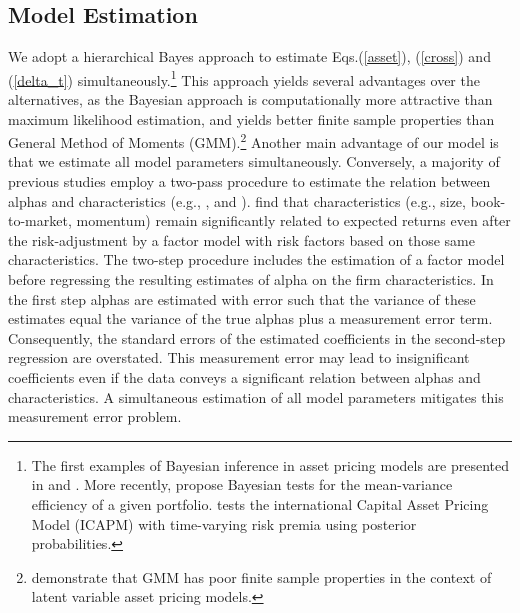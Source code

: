 \subsection{Model Estimation}
\label{Bayes_Model} 
We adopt a hierarchical Bayes approach to estimate Eqs.(\ref{asset}), (\ref{cross}) and (\ref{delta_t}) simultaneously.\footnote{The first examples of Bayesian inference in asset pricing models are presented in \citet{mcculloch1990posterior} and \citet{harvey1990bayesian}. More recently, \citet{cremers2006multifactor} propose Bayesian tests for the mean-variance efficiency of a given portfolio. \citet{avramov2006exact} tests the international Capital Asset Pricing Model (ICAPM) with time-varying risk premia using posterior probabilities.} This approach yields several advantages over the alternatives, as the Bayesian approach is computationally more attractive than maximum likelihood estimation, and yields better finite sample properties than General Method of Moments (GMM).\footnote{\citet{ferson1995method} demonstrate that GMM has poor finite sample properties in the context of latent variable asset pricing models.} 
 Another main advantage of our model is that we estimate all model parameters simultaneously. Conversely, a majority of previous studies employ a two-pass procedure to estimate the relation between alphas and characteristics (e.g., \citet{brennan1998alternative}, \citet{avramov2006asset} and \citet{busse2017double}). \citet{brennan1998alternative} find that characteristics (e.g., size, book-to-market, momentum) remain significantly related to expected returns even after the risk-adjustment by a factor model with risk factors based on those same characteristics. The two-step procedure includes the estimation of a factor model before regressing the resulting estimates of alpha on the firm characteristics. In the first step alphas are estimated with error such that the variance of these estimates equal the variance of the true alphas plus a measurement error term. Consequently, the standard errors of the estimated coefficients in the second-step regression are overstated. This measurement error may lead to insignificant coefficients even if the data conveys a significant relation between alphas and characteristics. A simultaneous estimation of all model parameters mitigates this measurement error problem.


